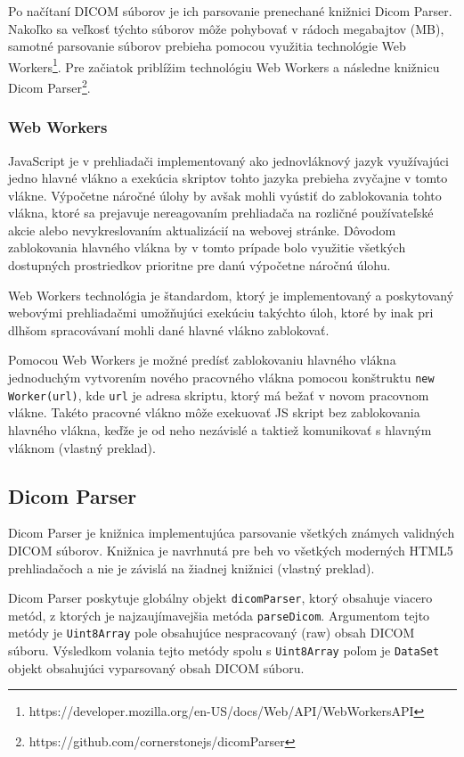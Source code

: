 Po načítaní DICOM súborov je ich parsovanie prenechané knižnici Dicom Parser. Nakoľko sa veľkosť týchto súborov môže pohybovať v rádoch megabajtov (MB), samotné parsovanie súborov prebieha pomocou využitia technológie Web Workers\footnote{https://developer.mozilla.org/en-US/docs/Web/API/Web\textunderscore Workers\textunderscore API}. Pre začiatok priblížim technológiu Web Workers a následne knižnicu Dicom Parser\footnote{https://github.com/cornerstonejs/dicomParser}.

\subsubsection {Web Workers}
JavaScript je v prehliadači implementovaný ako jednovláknový jazyk využívajúci jedno hlavné vlákno a exekúcia skriptov tohto jazyka prebieha zvyčajne v tomto vlákne. Výpočetne náročné úlohy by avšak mohli vyústiť do zablokovania tohto vlákna, ktoré sa prejavuje nereagovaním prehliadača na rozličné používateľské akcie alebo nevykreslovaním aktualizácií na webovej stránke. Dôvodom zablokovania hlavného vlákna by v tomto prípade bolo využitie všetkých dostupných prostriedkov prioritne pre danú výpočetne náročnú úlohu.

Web Workers technológia je štandardom, ktorý je implementovaný a poskytovaný webovými prehliadačmi umožňujúci exekúciu takýchto úloh, ktoré by inak pri dlhšom spracovávaní mohli dané hlavné vlákno zablokovať.

Pomocou Web Workers je možné predísť zablokovaniu hlavného vlákna jednoduchým vytvorením nového pracovného vlákna pomocou konštruktu \texttt{new Worker(url)}, kde \texttt{url} je adresa skriptu, ktorý má bežať v novom pracovnom vlákne. Takéto pracovné vlákno môže exekuovať JS skript bez zablokovania hlavného vlákna, keďže je od neho nezávislé a taktiež komunikovať s hlavným vláknom \cite{using_web_workers} (vlastný preklad).

\subsection {Dicom Parser}
Dicom Parser je knižnica implementujúca parsovanie všetkých známych validných DICOM súborov. Knižnica je navrhnutá pre beh vo všetkých moderných HTML5 prehliadačoch a nie je závislá na žiadnej knižnici \cite{about_dicom_parser} (vlastný preklad).

Dicom Parser poskytuje globálny objekt \texttt{dicomParser}, ktorý obsahuje viacero metód, z ktorých je najzaujímavejšia metóda \texttt{parseDicom}. Argumentom tejto metódy je \texttt{Uint8Array} pole obsahujúce nespracovaný (raw) obsah DICOM súboru. Výsledkom volania tejto metódy spolu s \texttt{Uint8Array} poľom je \texttt{DataSet} objekt obsahujúci vyparsovaný obsah DICOM súboru.

